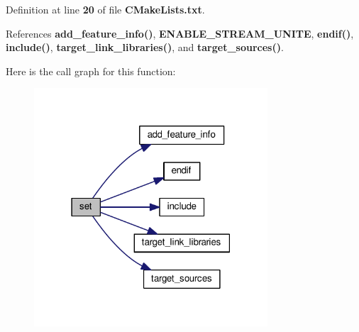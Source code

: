 Definition at line {\bf 20} of file {\bf C\+Make\+Lists.\+txt}.



References {\bf add\+\_\+feature\+\_\+info()}, {\bf E\+N\+A\+B\+L\+E\+\_\+\+S\+T\+R\+E\+A\+M\+\_\+\+U\+N\+I\+TE}, {\bf endif()}, {\bf include()}, {\bf target\+\_\+link\+\_\+libraries()}, and {\bf target\+\_\+sources()}.



Here is the call graph for this function\+:
\nopagebreak
\begin{figure}[H]
\begin{center}
\leavevmode
\includegraphics[width=247pt]{dd/d72/src_2ConnectionSTREAM__UNITE_2CMakeLists_8txt_a2726037e93ee5935bfee1b2378797688_cgraph}
\end{center}
\end{figure}


